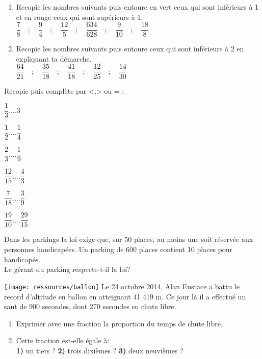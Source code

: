 \begin{multicols}{2}
\exo{}
\begin{enumerate}[label=\textbf{\alph*.}]
\item Recopie les nombres suivants puis entoure en vert ceux qui sont inférieurs à 1 et en rouge ceux qui sont supérieurs à 1.\\
$\dfrac{7}{8} \quad ;   \quad\dfrac{9}{4}  \quad ;  \quad \dfrac{12}{5}  \quad ;    \quad \dfrac{634}{628}\quad ; \quad \dfrac{9}{10}\quad; \quad \dfrac{18}{8}$\\
\item Recopie les nombres suivants puis entoure ceux qui sont inférieurs à 2  en expliquant ta démarche.\\
$\dfrac{64}{21} \quad ;   \quad\dfrac{35}{18}  \quad ;  \quad \dfrac{41}{18}  \quad ;    \quad \dfrac{12}{25}\quad ; \quad \dfrac{14}{30}$\\
\end{enumerate}

\columnbreak

\exo{}
Recopie puis complète par <,> ou = :
\begin{enumerate}[label=\textbf{\alph*.}]
\begin{multicols}{2}
\begin{spacing}{2}
\item $ \dfrac{1}{3} .... 3$
\item $ \dfrac{1}{2} .... \dfrac{1}{4}$
\item $ \dfrac{2}{3} .... \dfrac{1}{9}$
\item $ \dfrac{12}{15} .... \dfrac{4}{3}$
\item $ \dfrac{7}{18} .... \dfrac{3}{9}$
\item $ \dfrac{19}{10} .... \dfrac{29}{15}$
\item 
\end{spacing}
\end{multicols}
\end{enumerate}

\exo{}
Dans les parkings la loi exige que, sur 50 places, au moins une soit réservée aux personnes handicapées. Un parking de 600 places contient 10 places pour handicapés.\\
Le gérant du parking respecte-t-il la loi?


\exo{}
\texttt{[image: ressources/ballon]}
Le 24 octobre 2014, Alan Eustace a battu le record d'altitude en ballon en atteignant 41 419 m. Ce jour là il a effectué un saut de 900 secondes, dont 270 secondes en chute libre.
\begin{enumerate}[label=\textbf{\alph*.}]
\item Exprimer avec une fraction la proportion du temps de chute libre.
\item Cette fraction est-elle égale à:\\
\textbf{1)} un tiers ?  \quad  \textbf{2)} trois dixièmes ?  \quad \textbf{3)} deux neuvièmes ?
\end{enumerate}


\end{multicols}
